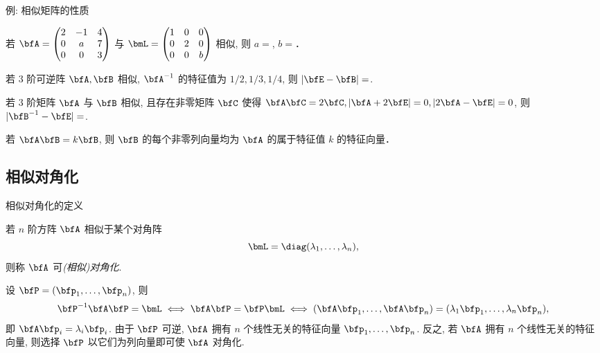 \begin{frame}{例: 相似矩阵的性质}
	\onslide<+->
	\begin{example}
		若 $\bfA=\begin{pmatrix}
			2&-1&4\\
			0&a&7\\
			0&0&3
		\end{pmatrix}$ 与 $\bmL=\begin{pmatrix}
			1&0&0\\
			0&2&0\\
			0&0&b
		\end{pmatrix}$ 相似, 则 $a=$, $b=$．
	\end{example}
	\onslide<+->
	\begin{example}
		若 $3$ 阶可逆阵 $\bfA,\bfB$ 相似, $\bfA^{-1}$ 的特征值为 $1/2,1/3,1/4$, 则 $|\bfE-\bfB|=$\fillblankframe{$-6$}.
	\end{example}
	\onslide<+->
	\begin{exercise}
		若 $3$ 阶矩阵 $\bfA$ 与 $\bfB$ 相似, 且存在非零矩阵 $\bfC$ 使得 $\bfA\bfC=2\bfC, |\bfA+2\bfE|=0, |2\bfA-\bfE|=0$, 则 $|\bfB^{-1}-\bfE|=$\fillblankframe{\visible<5->{$3/4$}}.
	\end{exercise}
	\onslide<+->
	若 $\bfA\bfB=k\bfB$, 则 $\bfB$ 的每个非零列向量均为 $\bfA$ 的属于特征值 $k$ 的特征向量．
\end{frame}


\subsection{相似对角化}
\begin{frame}{相似对角化的定义}
	\onslide<+->
	\begin{definition}
		若 $n$ 阶方阵 $\bfA$ 相似于某个对角阵
		\[\bmL=\diag(\lambda_1,\dots,\lambda_n),\]
		则称 $\bfA$ 可\emph{(相似)对角化}.
	\end{definition}
	\onslide<+->
	设 $\bfP=(\bfp_1,\dots,\bfp_n)$, 则
	\[\bfP^{-1}\bfA\bfP=\bmL\iff
	\bfA\bfP=\bfP\bmL\iff
	(\bfA\bfp_1,\dots,\bfA\bfp_n)
	=(\lambda_1\bfp_1,\dots,\lambda_n\bfp_n),\]
	\onslide<+->
	即 $\bfA\bfp_i=\lambda_i\bfp_i$.
	\onslide<+->
	由于 $\bfP$ 可逆, $\bfA$ 拥有 $n$ 个线性无关的特征向量 $\bfp_1,\dots,\bfp_n$.
	\onslide<+->
	反之, 若 $\bfA$ 拥有 $n$ 个线性无关的特征向量, 则选择 $\bfP$ 以它们为列向量即可使 $\bfA$ 对角化.
\end{frame}


